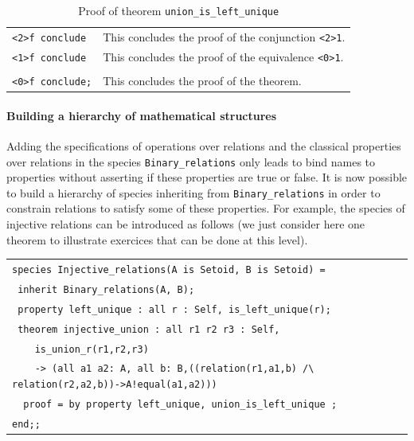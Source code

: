 \documentclass[submission,copyright,creativecommons]{eptcs}
\begin{document}
\begin{table}
\begin{center}
{\begin{tabular}{|ll|}
\hspace{0.8cm}  \verb+<2>f conclude+ & This concludes the proof of the
conjunction \verb+<2>1+. \\
\hspace{0.5cm}  \verb+<1>f conclude+ & This concludes the proof of the
equivalence \verb+<0>1+.\\
\mbox{} & \\
\hspace{0.2cm}  \verb+<0>f conclude;+ & This concludes the proof of
the theorem. \\
\hline
\end{tabular}
}
\end{center}
\caption{Proof of theorem {\footnotesize \tt union\_is\_left\_unique}}\label{proof_inj}
\end{table}

\paragraph{Building a hierarchy of mathematical structures}
Adding the specifications of operations over relations and the
classical properties over relations in the species {\footnotesize \tt Binary\_relations} only 
leads to bind names to properties without
asserting if these properties are true or false.
It is now possible to build a hierarchy of species inheriting from
{\footnotesize \tt Binary\_relations} in order to constrain relations
to satisfy some of these properties. For example, the species of
injective relations can be introduced as follows (we just consider
here one theorem to illustrate exercices that can be done at this level).

\begin{center}
\begin{scriptsize}
\begin{tabular}{|l|}
\hline
\verb+species Injective_relations(A is Setoid, B is Setoid) =+\\
\verb+ inherit Binary_relations(A, B);+\\
\verb+ property left_unique : all r : Self, is_left_unique(r);+\\
\verb+ theorem injective_union : all r1 r2 r3 : Self, +\\
\verb+    is_union_r(r1,r2,r3) +\\
\verb+    -> (all a1 a2: A, all b: B,((relation(r1,a1,b) /\ relation(r2,a2,b))->A!equal(a1,a2)))+\\
\verb+  proof = by property left_unique, union_is_left_unique ;+\\
\verb+end;;+\\
\hline
\end{tabular}
\end{scriptsize}
\end{center}
\end{document}
